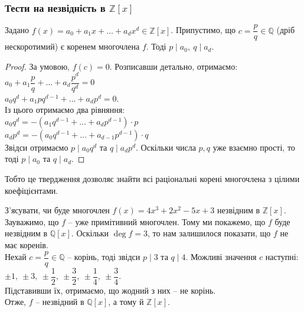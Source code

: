 \documentclass{math_library}
\begin{document}
\subsubsection*{Тести на незвідність в $\mathbb{Z}[x]$}
\begin{proposition}
Задано $f(x) = a_0 + a_1 x + \dots + a_d x^d \in \mathbb{Z}[x]$. Припустимо, що $c = \dfrac{p}{q} \in \mathbb{Q}$ (дріб нескоротимий) є коренем многочлена $f$. Тоді $p \mid a_0,\ q \mid a_d$.
\end{proposition}

\begin{proof}
За умовою, $f(c) = 0$. Розписавши детально, отримаємо:\\
$a_0 + a_1 \dfrac{p}{q} + \dots + a_d \dfrac{p^d}{q^d} = 0$\\
$a_0 q^d + a_1 p q^{d-1} + \dots + a_d p^d = 0$.\\
Із цього отримаємо два рівняння:\\
$a_0 q^d = -(a_1 q^{d-1} + \dots + a_d p^{d-1}) \cdot p$\\
$a_d p^d = -(a_0 q^{d-1} + \dots + a_{d-1} p^{d-1}) \cdot q$\\
Звідси отримаємо $p \mid a_0 q^d$ та $q \mid a_d p^d$. Оскільки числа $p,q$ уже взаємно прості, то тоді $p \mid a_0$ та $q \mid a_d$.
\end{proof}

\begin{remark}
Тобто це твердження дозволяє знайти всі раціональні корені многочлена з цілими коефіцієнтами.
\end{remark}

\begin{example}
З'ясувати, чи буде многочлен $f(x) = 4x^3 + 2x^2 - 5x + 3$ незвідним в $\mathbb{Z}[x]$.\\
Зауважимо, що $f$ -- уже примітивний многочлен. Тому ми покажемо, що $f$ буде незвідним в $\mathbb{Q}[x]$. Оскільки $\deg f = 3$, то нам залишилося показати, що $f$ не має коренів.\\
Нехай $c = \dfrac{p}{q} \in \mathbb{Q}$ -- корінь, тоді звідси $p \mid 3$ та $q \mid 4$. Можливі значення $c$ наступні:\\
$\pm 1,\ \pm 3,\ \pm \dfrac{1}{2},\ \pm \dfrac{3}{2},\ \pm \dfrac{1}{4},\ \pm\dfrac{3}{4}$.\\
Підставивши їх, отримаємо, що жодний з них -- не корінь.\\
Отже, $f$ -- незвідний в $\mathbb{Q}[x]$, а тому й $\mathbb{Z}[x]$.
\end{example}
\end{document}

